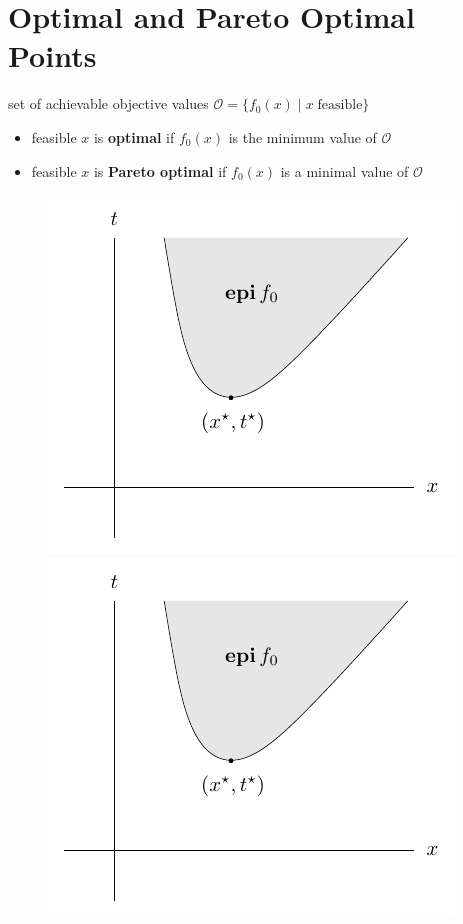 \documentclass[11pt]{extarticle}
\newcommand{\ds}{\displaystyle}
\theoremstyle{definition}
\begin{document}
\section*{Optimal and Pareto Optimal Points}
set of achievable objective values $\ds\mathcal{O} = \{f_0(x)\;|\;x\;\text{feasible}\}$
\begin{itemize}
  \item feasible $x$ is {\bf optimal} if $f_0(x)$ is the minimum value of $\mathcal{O}$
  \item feasible $x$ is {\bf Pareto optimal} if $f_0(x)$ is a minimal value of $\mathcal{O}$
\end{itemize}
\begin{figure}[!htbp]
  \centering
  \includegraphics[scale=0.75,page=7]{fig/04.pdf}
  \includegraphics[scale=0.75,page=8]{fig/04.pdf}
\end{figure}
\end{document}
